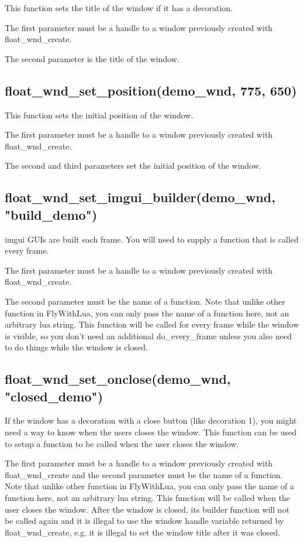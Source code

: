\documentclass[11pt,parskip=half,a4paper]{scrartcl}
\begin{document}
This function sets the title of the window if it has a decoration.

The first parameter must be a handle to a window previously created with float\_wnd\_create.

The second parameter is the title of the window.

\subsection{float\_wnd\_set\_position(demo\_wnd, 775, 650)}

This function sets the initial position of the window.

The first parameter must be a handle to a window previously created with float\_wnd\_create.

The second and third parameters set the initial position of the window.

\subsection{float\_wnd\_set\_imgui\_builder(demo\_wnd, "build\_demo")}

imgui GUIs are built each frame. You will need to supply a function that is called every frame.

The first parameter must be a handle to a window previously created with float\_wnd\_create.

The second parameter must be the name of a function. Note that unlike other function in FlyWithLua, you
can only pass the name of a function here, not an arbitrary lua string. This function will be called for
every frame while the window is visible, so you don't need an additional do\_every\_frame unless you
also need to do things while the window is closed.

\subsection{float\_wnd\_set\_onclose(demo\_wnd, "closed\_demo")}

If the window has a decoration with a close button (like decoration 1), you might need a way to know when the users closes the window. This function can be used to setup a function to be called when the user closes the window.

The first parameter must be a handle to a window previously created with float\_wnd\_create and the second parameter must be the name of a function. Note that unlike other function in FlyWithLua, you
can only pass the name of a function here, not an arbitrary lua string. This function will be called
when the user closes the window. After the window is closed, its builder function will not be called
again and it is illegal to use the window handle variable returned by float\_wnd\_create, e.g. it is illegal
to set the window title after it was closed.
\end{document}
